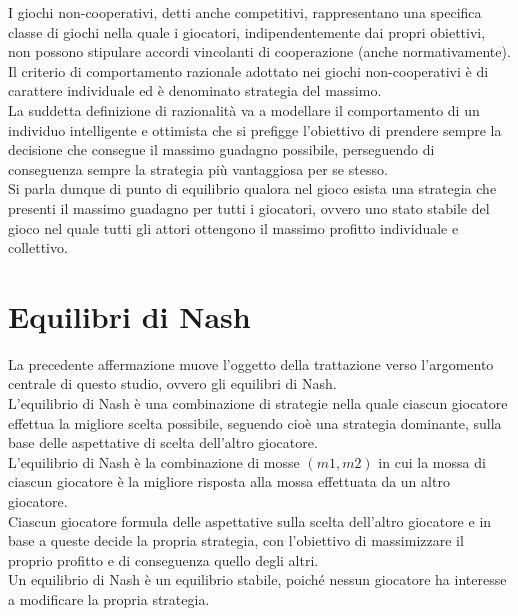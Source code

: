 I giochi non-cooperativi, detti anche competitivi, rappresentano una specifica classe di giochi nella quale i giocatori, indipendentemente dai propri obiettivi, non possono stipulare accordi vincolanti di cooperazione (anche normativamente).\\

Il criterio di comportamento razionale adottato nei giochi non-cooperativi è di carattere individuale ed è denominato strategia del massimo.\\

La suddetta definizione di razionalità va a modellare il comportamento di un individuo intelligente e ottimista che si prefigge l'obiettivo di prendere sempre la decisione che consegue il massimo guadagno possibile, perseguendo di conseguenza sempre la strategia più vantaggiosa per se stesso.\\

Si parla dunque di punto di equilibrio qualora nel gioco esista una strategia che presenti il massimo guadagno per tutti i giocatori, ovvero uno stato stabile del gioco nel quale tutti gli attori ottengono il massimo profitto individuale e collettivo.\\

\section{Equilibri di Nash}
\justify
La precedente affermazione muove l'oggetto della trattazione verso l'argomento centrale di questo studio, ovvero gli equilibri di Nash.\\

L'equilibrio di Nash è una combinazione di strategie nella quale ciascun giocatore effettua la migliore scelta possibile, seguendo cioè una strategia dominante, sulla base delle aspettative di scelta dell'altro giocatore.\\

L'equilibrio di Nash è la combinazione di mosse \((m1, m2)\) in cui la mossa di ciascun giocatore è la migliore risposta alla mossa effettuata da un altro giocatore.\\

Ciascun giocatore formula delle aspettative sulla scelta dell'altro giocatore e in base a queste decide la propria strategia, con l'obiettivo di massimizzare il proprio profitto e di conseguenza quello degli altri.\\

Un equilibrio di Nash è un equilibrio stabile, poiché nessun giocatore ha interesse a modificare la propria strategia.\\

